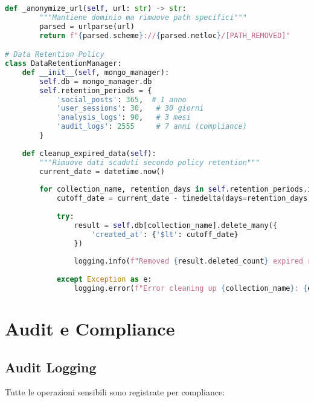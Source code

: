 \documentclass[12pt,a4paper]{report}
\begin{document}
\begin{lstlisting}[language=python, caption=Data Anonymization Service]
    def _anonymize_url(self, url: str) -> str:
        """Mantiene dominio ma rimuove path specifici"""
        parsed = urlparse(url)
        return f"{parsed.scheme}://{parsed.netloc}/[PATH_REMOVED]"

# Data Retention Policy
class DataRetentionManager:
    def __init__(self, mongo_manager):
        self.db = mongo_manager.db
        self.retention_periods = {
            'social_posts': 365,  # 1 anno
            'user_sessions': 30,   # 30 giorni
            'analysis_logs': 90,   # 3 mesi
            'audit_logs': 2555     # 7 anni (compliance)
        }
    
    def cleanup_expired_data(self):
        """Rimuove dati scaduti secondo policy retention"""
        current_date = datetime.now()
        
        for collection_name, retention_days in self.retention_periods.items():
            cutoff_date = current_date - timedelta(days=retention_days)
            
            try:
                result = self.db[collection_name].delete_many({
                    'created_at': {'$lt': cutoff_date}
                })
                
                logging.info(f"Removed {result.deleted_count} expired records from {collection_name}")
                
            except Exception as e:
                logging.error(f"Error cleaning up {collection_name}: {e}")
\end{lstlisting}

\section{Audit e Compliance}

\subsection{Audit Logging}

Tutte le operazioni sensibili sono registrate per compliance:
\end{document}
